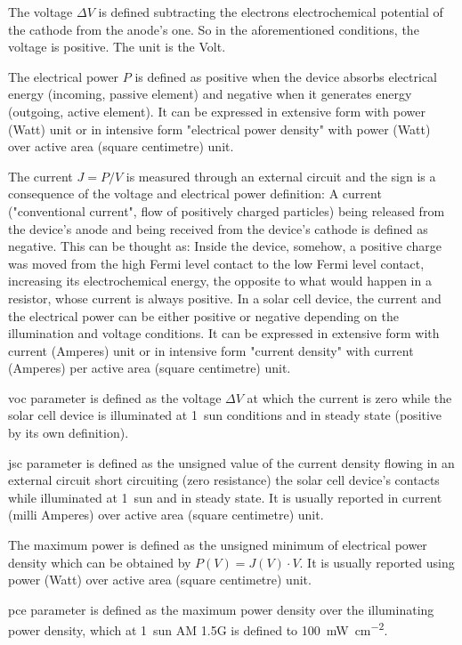 	The voltage $\Delta V$ is defined subtracting the electrons electrochemical potential of the cathode from the anode's one. So in the aforementioned conditions, the voltage is positive. The unit is the Volt.
	
	The electrical power $P$ is defined as positive when the device absorbs electrical energy (incoming, passive element) and negative when it generates energy (outgoing, active element). It can be expressed in extensive form with power (Watt) unit or in intensive form "electrical power density" with power (Watt) over active area (square centimetre) unit.
	
	The current $J=P/V$ is measured through an external circuit and the sign is a consequence of the voltage and electrical power definition: A current ("conventional current", flow of positively charged particles) being released from the device's anode and being received from the device's cathode is defined as negative. This can be thought as: Inside the device, somehow, a positive charge was moved from the high Fermi level contact to the low Fermi level contact, increasing its electrochemical energy, the opposite to what would happen in a resistor, whose current is always positive. In a solar cell device, the current and the electrical power can be either positive or negative depending on the illumination and voltage conditions. It can be expressed in extensive form with current (Amperes) unit or in intensive form "current density" with current (Amperes) per active area (square centimetre) unit.

		\Gls{voc} parameter is defined as the voltage $\Delta V$ at which the current is zero while the solar cell device is illuminated at 1~sun conditions and in steady state (positive by its own definition).

\Gls{jsc} parameter is defined as the unsigned value of the current density flowing in an external circuit short circuiting (zero resistance) the solar cell device's contacts while illuminated at 1~sun and in steady state. It is usually reported in current (milli Amperes) over active area (square centimetre) unit.

The maximum power is defined as the unsigned minimum of electrical power density which can be obtained by $P(V) = J(V) \cdot V$. It is usually reported using power (Watt) over active area (square centimetre) unit.

\Gls{pce} parameter is defined as the maximum power density over the illuminating power density, which at 1~sun AM 1.5G is defined to \SI{100}{\mW\per\square\cm}.

